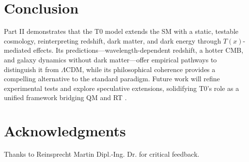 \documentclass[12pt,a4paper]{article}
\newenvironment{acknowledgments}
{\section*{Acknowledgments}}
{\vspace{1em}}
\newcommand{\Tfield}{T(x)}
\begin{document}
	\section{Conclusion}
	\label{sec:conclusion}
	
	Part II demonstrates that the T0 model extends the SM with a static, testable cosmology, reinterpreting redshift, dark matter, and dark energy through \(\Tfield\)-mediated effects. Its predictions—wavelength-dependent redshift, a hotter CMB, and galaxy dynamics without dark matter—offer empirical pathways to distinguish it from \(\Lambda\)CDM, while its philosophical coherence provides a compelling alternative to the standard paradigm. Future work will refine experimental tests and explore speculative extensions, solidifying T0’s role as a unified framework bridging QM and RT \cite{pascher_perspective_2025}.
	
	\begin{acknowledgments}
		Thanks to Reinsprecht Martin Dipl.-Ing. Dr. for critical feedback.
	\end{acknowledgments}
	
\end{document}
